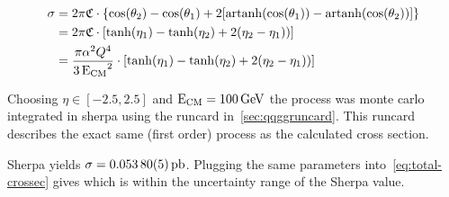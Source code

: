 \begin{equation}
  \label{eq:total-crossec}
  \begin{split}
  \sigma &=
  2\pi\mathfrak{C}\cdot\qty{\cos(\theta_2)-\cos(\theta_1)+2\qty[\operatorname{artanh}(\cos(\theta_1))
    - \operatorname{artanh}(\cos(\theta_2))]} \\
  &=2\pi\mathfrak{C}\cdot\qty[\tanh(\eta_1) - \tanh(\eta_2) + 2(\eta_2
  - \eta_1))] \\
  &={\frac{\pi\alpha^2Q^4}{3\operatorname{E_{\text{CM}}}^2}}\cdot\qty[\tanh(\eta_1) - \tanh(\eta_2) + 2(\eta_2
  - \eta_1))]
  \end{split}
\end{equation}

Choosing \(\eta\in [-2.5,2.5]\) and
\(\operatorname{E_{\text{CM}}}=\SI{100}{\giga\electronvolt}\) the process was monte carlo
integrated in sherpa using the runcard in~\ref{sec:qqggruncard}. This
runcard describes the exact same (first order) process as the
calculated cross section.

Sherpa yields \(\sigma = \SI{0.05380\pm
  .00005}{\pico\barn}\). Plugging the same parameters
into~\eqref{eq:total-crossec} gives  which is
within the uncertainty range of the Sherpa value.
